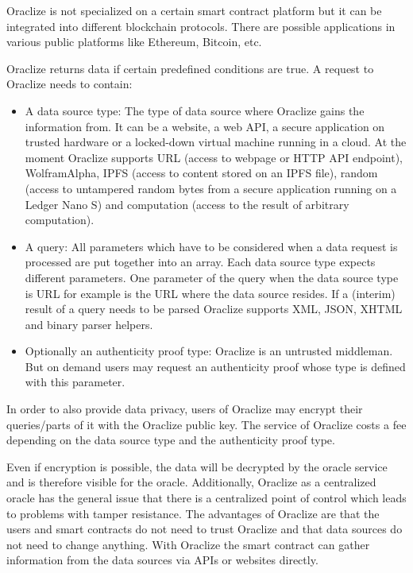 \documentclass[conference]{IEEEtran}
\begin{document}
Oraclize is not specialized on a certain smart contract platform but it can be integrated into different blockchain protocols. There are possible applications in various public platforms like Ethereum, Bitcoin, etc. \cite{Oraclize2017} \par 
Oraclize returns data if certain predefined conditions are true. A request to Oraclize needs to contain:
\begin{itemize}
	\item A data source type: The type of data source where Oraclize gains the information from. It can be a website, a web API, a secure application on trusted hardware or a locked-down virtual machine running in a cloud. At the moment Oraclize supports URL (access to  webpage or HTTP API endpoint), WolframAlpha, IPFS (access to content stored on an IPFS file), random (access to untampered random bytes from a secure application running on a Ledger Nano S) and computation (access to the result of arbitrary computation).
	\item A query: All parameters which have to be considered when a data request is processed are put together into an array. Each data source type expects different parameters. One parameter of the query when the data source type is URL for example is the URL where the data source resides. If a (interim) result of a query needs to be parsed Oraclize supports XML, JSON, XHTML and binary parser helpers.
	\item Optionally an authenticity proof type: Oraclize is an untrusted middleman. But on demand users may request an authenticity proof whose type is defined with this parameter. \cite{Oraclize2017}
\end{itemize}
In order to also provide data privacy, users of Oraclize may encrypt their queries/parts of it with the Oraclize public key. The service of Oraclize costs a fee depending on the data source type and the authenticity proof type. \cite{Oraclize2017} \par
Even if encryption is possible, the data will be decrypted by the oracle service and is therefore visible for the oracle. Additionally, Oraclize as a centralized oracle has the general issue that there is a centralized point of control which leads to problems with tamper resistance. The advantages of Oraclize are that the users and smart contracts do not need to trust Oraclize and that data sources do not need to change anything. With Oraclize the smart contract can gather information from the data sources via APIs or websites directly. \cite{Ellis2017} \cite{Oraclize2017} \par    
\end{document}
